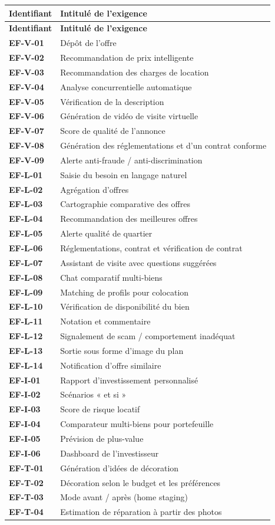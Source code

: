 \documentclass[11pt,a4paper]{article}
\begin{document}
\renewcommand{\arraystretch}{1.3}
\begin{longtable}{>{\bfseries}p{2.2cm} p{\dimexpr\textwidth-3cm}}
\toprule
\rowcolor{light}\textbf{Identifiant} & \textbf{Intitulé de l'exigence} \\
\midrule
\endfirsthead
\rowcolor{light}\textbf{Identifiant} & \textbf{Intitulé de l'exigence} \\
\midrule
\endhead
\bottomrule
\endfoot
EF-V-01 & Dépôt de l'offre \\
EF-V-02 & Recommandation de prix intelligente \\
EF-V-03 & Recommandation des charges de location \\
EF-V-04 & Analyse concurrentielle automatique \\
EF-V-05 & Vérification de la description \\
EF-V-06 & Génération de vidéo de visite virtuelle \\
EF-V-07 & Score de qualité de l'annonce \\
EF-V-08 & Génération des réglementations et d'un contrat conforme \\
EF-V-09 & Alerte anti-fraude / anti-discrimination \\
EF-L-01 & Saisie du besoin en langage naturel \\
EF-L-02 & Agrégation d'offres \\
EF-L-03 & Cartographie comparative des offres \\
EF-L-04 & Recommandation des meilleures offres \\
EF-L-05 & Alerte qualité de quartier \\
EF-L-06 & Réglementations, contrat et vérification de contrat \\
EF-L-07 & Assistant de visite avec questions suggérées \\
EF-L-08 & Chat comparatif multi-biens \\
EF-L-09 & Matching de profils pour colocation \\
EF-L-10 & Vérification de disponibilité du bien \\
EF-L-11 & Notation et commentaire \\
EF-L-12 & Signalement de scam / comportement inadéquat \\
EF-L-13 & Sortie sous forme d'image du plan \\
EF-L-14 & Notification d'offre similaire \\
EF-I-01 & Rapport d'investissement personnalisé \\
EF-I-02 & Scénarios « et si » \\
EF-I-03 & Score de risque locatif \\
EF-I-04 & Comparateur multi-biens pour portefeuille \\
EF-I-05 & Prévision de plus-value \\
EF-I-06 & Dashboard de l'investisseur \\
EF-T-01 & Génération d'idées de décoration \\
EF-T-02 & Décoration selon le budget et les préférences \\
EF-T-03 & Mode avant / après (home staging) \\
EF-T-04 & Estimation de réparation à partir des photos \\
\end{longtable}
\end{document}
